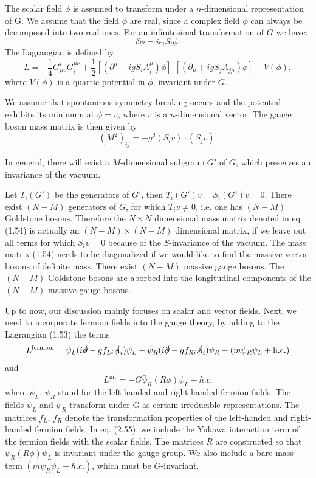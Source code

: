 The scalar field $\phi$ is assumed to transform under a $n$-dimensional representation of G. We assume that the field $\phi$ are real, since a complex field $\phi$ can always be decomposed into two real ones. For an infinitesimal transformation of $G$ we have:
\begin{equation}
\delta \phi=i\epsilon_i S_i\phi.
\end{equation}
The Lagrangian is defined by
\begin{equation}
L=-\frac{1}{4}G^i_{\mu\nu}G_i^{\mu\nu}+\frac{1}{2}[(\partial^\mu +igS_iA_i^\mu)\phi]^{\dagger}[(\partial_\mu +igS_jA_{j\mu})\phi]-V(\phi),
\end{equation}
where $V(\phi)$ is a quartic potential in $\phi$, invariant under $G$.

We assume that spontaneous symmetry breaking occurs and the potential exhibits its minimum at $\phi=v$, where $v$ is a $n$-dimensional vector. The gauge boson mass matrix is then given by 
\begin{equation}
(M^2)_{ij}=-g^2(S_i v)\cdot (S_j v).
\end{equation}

In general, there will exist a $M$-dimensional subgroup $G'$ of $G$, which preserves an invariance of the vacuum. 

Let $T_i(G')$ be the generators of $G'$, then $T_i(G')v=S_i(G')v=0$. There exist $(N-M)$ generators of $G$, for which $T_i v\ne0$, i.e. one has $(N-M)$ Goldstone bosons. Therefore the $N\times N$ dimensional mass matrix denoted in eq.(1.54) is actually an $(N-M)\times(N-M)$ dimensional matrix, if we leave out all terms for which $S_i v=0$ because of the $S$-invariance of the vacuum. The mass matrix (1.54) needs to be diagonalized if we would like to find the massive vector bosons of definite mass. There exist $(N-M)$ massive gauge bosons. The $(N-M)$ Goldstone bosons are aborbed into the longitudinal components of the $(N-M)$ massive gauge bosons.   

Up to now, our discussion mainly focuses on scalar and vector fields. Next, we need to incorporate fermion fields into the gauge theory, by adding to the Lagrangian (1.53) the terms
\begin{equation}
L^{\text{fermion}}=\bar{\psi}_L(i\slashed{\partial}-gf_{Li}\slashed{A}_i)
\psi_L+\bar{\psi}_R(i\slashed{\partial}-gf_{Ri}\slashed{A}_i)
\psi_R-(m\bar{\psi}_R\psi_L+\text{h.c.})
\end{equation} 
and
\begin{equation}
L^{\text{int}}=-G\bar{\psi}_R(R\phi)\psi_L+h.c.
\end{equation}
where $\psi_L$, $\psi_R$ stand for the left-handed and right-handed fermion fields. The fields $\psi_L$ and $\psi_R$ transform under G as certain irreducible representations. The matrices $f_L$, $f_R$ denote the transformation properties of the left-handed and right-handed fermion fields. In eq. (2.55), we include the Yukawa interaction term of the fermion fields with the scalar fields. The matrices $R$ are constructed so that $\bar{\psi}_R(R\phi)\bar{\psi}_L$ is invariant under the gauge group. We also include a bare mass term $(m\bar{\psi}_R\psi_L+h.c.)$, which must be $G$-invariant. 


